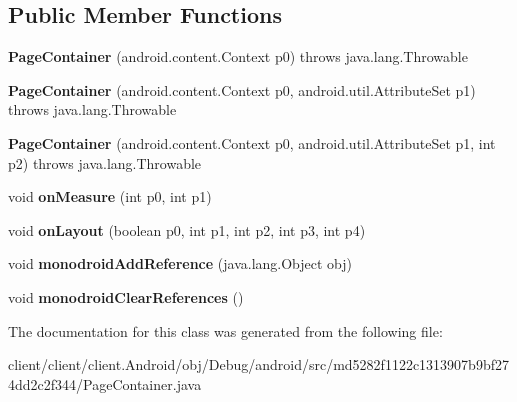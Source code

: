 \subsection*{Public Member Functions}
\begin{DoxyCompactItemize}
\item 
\hypertarget{classmd5282f1122c1313907b9bf274dd2c2f344_1_1PageContainer_aaf9d7ab7037f40fb24ae161fbc17b6fa}{}{\bfseries Page\+Container} (android.\+content.\+Context p0)  throws java.\+lang.\+Throwable 	\label{classmd5282f1122c1313907b9bf274dd2c2f344_1_1PageContainer_aaf9d7ab7037f40fb24ae161fbc17b6fa}

\item 
\hypertarget{classmd5282f1122c1313907b9bf274dd2c2f344_1_1PageContainer_a25efe5bfaebf5f71c6991d3c9e86e471}{}{\bfseries Page\+Container} (android.\+content.\+Context p0, android.\+util.\+Attribute\+Set p1)  throws java.\+lang.\+Throwable 	\label{classmd5282f1122c1313907b9bf274dd2c2f344_1_1PageContainer_a25efe5bfaebf5f71c6991d3c9e86e471}

\item 
\hypertarget{classmd5282f1122c1313907b9bf274dd2c2f344_1_1PageContainer_ac6ab9f0e72deb7294db1ffc2b91cc7ce}{}{\bfseries Page\+Container} (android.\+content.\+Context p0, android.\+util.\+Attribute\+Set p1, int p2)  throws java.\+lang.\+Throwable 	\label{classmd5282f1122c1313907b9bf274dd2c2f344_1_1PageContainer_ac6ab9f0e72deb7294db1ffc2b91cc7ce}

\item 
\hypertarget{classmd5282f1122c1313907b9bf274dd2c2f344_1_1PageContainer_aa3257fc99e5e68e0f44eda4ffa8992bc}{}void {\bfseries on\+Measure} (int p0, int p1)\label{classmd5282f1122c1313907b9bf274dd2c2f344_1_1PageContainer_aa3257fc99e5e68e0f44eda4ffa8992bc}

\item 
\hypertarget{classmd5282f1122c1313907b9bf274dd2c2f344_1_1PageContainer_ab3a834f7ed3c9d826b8788f4ed103165}{}void {\bfseries on\+Layout} (boolean p0, int p1, int p2, int p3, int p4)\label{classmd5282f1122c1313907b9bf274dd2c2f344_1_1PageContainer_ab3a834f7ed3c9d826b8788f4ed103165}

\item 
\hypertarget{classmd5282f1122c1313907b9bf274dd2c2f344_1_1PageContainer_a28d8910ce98b70139490b0bf8c6aec05}{}void {\bfseries monodroid\+Add\+Reference} (java.\+lang.\+Object obj)\label{classmd5282f1122c1313907b9bf274dd2c2f344_1_1PageContainer_a28d8910ce98b70139490b0bf8c6aec05}

\item 
\hypertarget{classmd5282f1122c1313907b9bf274dd2c2f344_1_1PageContainer_ac5da17000a375b40c241c6fda1af7a58}{}void {\bfseries monodroid\+Clear\+References} ()\label{classmd5282f1122c1313907b9bf274dd2c2f344_1_1PageContainer_ac5da17000a375b40c241c6fda1af7a58}

\end{DoxyCompactItemize}


The documentation for this class was generated from the following file\+:\begin{DoxyCompactItemize}
\item 
client/client/client.\+Android/obj/\+Debug/android/src/md5282f1122c1313907b9bf274dd2c2f344/Page\+Container.\+java\end{DoxyCompactItemize}
